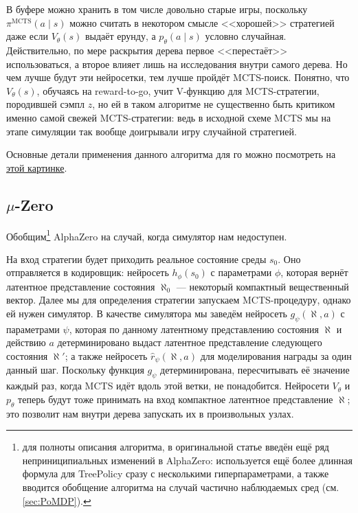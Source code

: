 В буфере можно хранить в том числе довольно старые игры, поскольку $\pi^{\mathrm{MCTS}}(a \mid s)$ можно считать в некотором смысле <<хорошей>> стратегией даже если $V_\theta(s)$ выдаёт ерунду, а $p_{\theta}(a \mid s)$ условно случайная. Действительно, по мере раскрытия дерева первое <<перестаёт>> использоваться, а второе влияет лишь на исследования внутри самого дерева. Но чем лучше будут эти нейросетки, тем лучше пройдёт MCTS-поиск. Понятно, что $V_{\theta}(s)$, обучаясь на reward-to-go, учит V-функцию для MCTS-стратегии, породившей сэмпл $z$, но ей в таком алгоритме не существенно быть критиком именно самой свежей MCTS-стратегии: ведь в исходной схеме MCTS мы на этапе симуляции так вообще доигрывали игру случайной стратегией.

\begin{example}
Основные детали применения данного алгоритма для го можно посмотреть на \href{https://miro.medium.com/max/2000/1*0pn33bETjYOimWjlqDLLNw.png}{этой картинке}.
\end{example}

\subsection{$\mu$-Zero}

Обобщим\footnote{для полноты описания алгоритма, в оригинальной статье введён ещё ряд неприниципиальных изменений в AlphaZero: используется ещё более длинная формула для TreePolicy сразу с несколькими гиперпараметрами, а также вводится обобщение алгоритма на случай частично наблюдаемых сред (см. \ref{sec:PoMDP}).} AlphaZero на случай, когда симулятор нам недоступен.

На вход стратегии будет приходить реальное состояние среды $s_0$. Оно отправляется в кодировщик: нейросеть $h_{\phi}(s_0)$ с параметрами $\phi$, которая вернёт латентное представление состояния $\aleph_0$ --- некоторый компактный вещественный вектор. Далее мы для определения стратегии запускаем MCTS-процедуру, однако ей нужен симулятор. В качестве симулятора мы заведём нейросеть $g_{\psi}(\aleph, a)$ с параметрами $\psi$, которая по данному латентному представлению состояния $\aleph$ и действию $a$ детерминировано выдаст латентное представление следующего состояния $\aleph'$; а также нейросеть $\hat{r}_{\psi}(\aleph, a)$ для моделирования награды за один данный шаг. Поскольку функция $g_{\psi}$ детерминирована, пересчитывать её значение каждый раз, когда MCTS идёт вдоль этой ветки, не понадобится. Нейросети $V_{\theta}$ и $p_{\theta}$ теперь будут тоже принимать на вход компактное латентное представление $\aleph$; это позволит нам внутри дерева запускать их в произвольных узлах.

